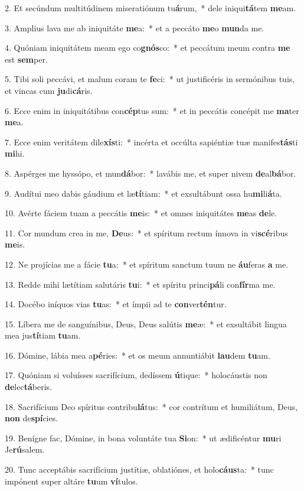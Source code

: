 2. Et secúndum multitúdinem miseratiónum tu\textbf{á}rum,~*  dele iniqui\textbf{tá}tem \textbf{me}am.\

3. Amplius lava me ab iniquitáte \textbf{me}a:~*  et a peccáto \textbf{me}o \textbf{mun}da me.\

4. Quóniam iniquitátem meam ego co\textbf{gnós}co:~*  et peccátum meum contra \textbf{me} est \textbf{sem}per.\

5. Tibi soli peccávi, et malum coram te \textbf{fe}ci:~*  ut justificéris in sermónibus tuis, et vincas cum \textbf{ju}di\textbf{cá}ris.\

6. Ecce enim in iniquitátibus con\textbf{cép}tus sum:~*  et in peccátis concépit me \textbf{ma}ter \textbf{me}a.\

7. Ecce enim veritátem dile\textbf{xís}ti:~*  incérta et occúlta sapiéntiæ tuæ manifes\textbf{tás}ti \textbf{mi}hi.\

8. Aspérges me hyssópo, et mun\textbf{dá}bor:~*  lavábis me, et super nivem \textbf{de}al\textbf{bá}bor.\

9. Audítui meo dabis gáudium et læ\textbf{tí}tiam:~*  et exsultábunt ossa hu\textbf{mi}li\textbf{á}ta.\

10. Avérte fáciem tuam a peccátis \textbf{me}is:~*  et omnes iniquitátes \textbf{me}as \textbf{de}le.\

11. Cor mundum crea in me, \textbf{De}us:~*  et spíritum rectum ínnova in vi\textbf{scé}ribus \textbf{me}is.\

12. Ne projícias me a fácie \textbf{tu}a:~*  et spíritum sanctum tuum ne \textbf{áu}feras \textbf{a} me.\

13. Redde mihi lætítiam salutáris \textbf{tu}i:~*  et spíritu princi\textbf{pá}li con\textbf{fír}ma me.\

14. Docébo iníquos vias \textbf{tu}as:~*  et ímpii ad te \textbf{con}ver\textbf{tén}tur.\

15. Líbera me de sanguínibus, Deus, Deus salútis \textbf{me}æ:~*  et exsultábit lingua mea jus\textbf{tí}tiam \textbf{tu}am.\

16. Dómine, lábia mea a\textbf{pé}ries:~*  et os meum annuntiábit \textbf{lau}dem \textbf{tu}am.\

17. Quóniam si voluísses sacrifícium, dedíssem \textbf{ú}tique:~*  holocáustis non \textbf{de}lec\textbf{tá}beris.\

18. Sacrifícium Deo spíritus contribu\textbf{lá}tus:~*  cor contrítum et humiliátum, Deus, \textbf{non} de\textbf{spí}cies.\

19. Benígne fac, Dómine, in bona voluntáte tua \textbf{Si}on:~*  ut ædificéntur \textbf{mu}ri Je\textbf{rú}salem.\

20. Tunc acceptábis sacrifícium justítiæ, oblatiónes, et holo\textbf{cáus}ta:~*  tunc impónent super altáre \textbf{tu}um \textbf{ví}tulos.\

